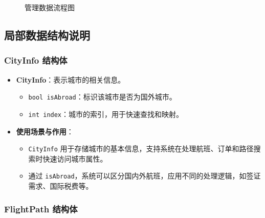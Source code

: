 \documentclass[UTF8, a4paper,12pt]{ctexart}
\begin{document}
\begin{figure}[h]
\begin{tikzpicture}
    \end{tikzpicture}
    \caption{管理数据流程图}
    \label{fig:manage_data_flowchart}
\end{figure}

\subsection{局部数据结构说明}

\subsubsection{CityInfo 结构体}

\begin{itemize}
    \item \textbf{CityInfo}：表示城市的相关信息。
    \begin{itemize}
        \item \texttt{bool isAbroad}：标识该城市是否为国外城市。
        \item \texttt{int index}：城市的索引，用于快速查找和映射。
    \end{itemize}
    \item \textbf{使用场景与作用}：
    \begin{itemize}
        \item \texttt{CityInfo} 用于存储城市的基本信息，支持系统在处理航班、订单和路径搜索时快速访问城市属性。
        \item 通过 \texttt{isAbroad}，系统可以区分国内外航班，应用不同的处理逻辑，如签证需求、国际税费等。
    \end{itemize}
\end{itemize}

\subsubsection{FlightPath 结构体}
\end{document}
